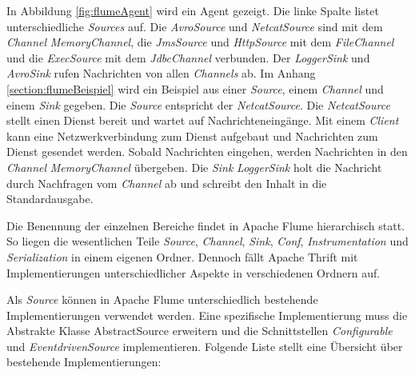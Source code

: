 In Abbildung \ref{fig:flumeAgent} wird ein Agent gezeigt. Die linke Spalte listet unterschiedliche \textit{Sources} auf. Die \textit{AvroSource} und \textit{NetcatSource} sind mit dem \textit{Channel} \textit{MemoryChannel}, die \textit{JmsSource} und \textit{HttpSource} mit dem \textit{FileChannel} und die \textit{ExecSource} mit dem \textit{JdbcChannel} verbunden. Der \textit{LoggerSink} und \textit{AvroSink} rufen Nachrichten von allen \textit{Channels} ab. Im Anhang \ref{section:flumeBeispiel} wird ein Beispiel aus einer \textit{Source}, einem \textit{Channel} und einem \textit{Sink} gegeben. Die \textit{Source} entspricht der \textit{NetcatSource}. Die \textit{NetcatSource} stellt einen Dienst bereit und wartet auf Nachrichteneingänge. Mit einem \textit{Client} kann eine Netzwerkverbindung zum Dienst aufgebaut und Nachrichten zum Dienst gesendet werden. Sobald Nachrichten eingehen, werden Nachrichten in den \textit{Channel} \textit{MemoryChannel} übergeben. Die \textit{Sink} \textit{LoggerSink} holt die Nachricht durch Nachfragen vom \textit{Channel} ab und schreibt den Inhalt in die Standardausgabe.

Die Benennung der einzelnen Bereiche findet in Apache Flume hierarchisch statt. So liegen die wesentlichen Teile \textit{Source}, \textit{Channel}, \textit{Sink}, \textit{Conf}, \textit{Instrumentation} und \textit{Serialization} in einem eigenen Ordner. Dennoch fällt Apache Thrift mit Implementierungen unterschiedlicher Aspekte in verschiedenen Ordnern auf. 

Als \textit{Source} können in Apache Flume unterschiedlich bestehende Implementierungen verwendet werden. Eine spezifische Implementierung muss die Abstrakte Klasse AbstractSource  erweitern und die Schnittstellen \textit{Configurable} und \textit{EventdrivenSource} implementieren. Folgende Liste stellt eine Übersicht über bestehende Implementierungen:

